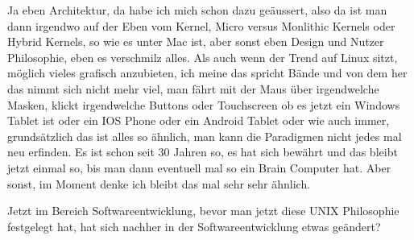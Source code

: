 \begin{description}
\NH Ja eben Architektur, da habe ich mich schon dazu geäussert, also da ist man dann irgendwo auf der Eben vom Kernel, Micro versus Monlithic Kernels oder Hybrid Kernels, so wie es unter Mac ist, aber sonst eben Design und Nutzer Philosophie, eben es verschmilz alles. Als auch wenn der Trend auf Linux sitzt, möglich vieles grafisch anzubieten, ich meine das spricht Bände und von dem her das nimmt sich nicht mehr viel, man fährt mit der Maus über irgendwelche Masken, klickt irgendwelche Buttons oder Touchscreen ob es jetzt ein Windows Tablet ist oder ein IOS Phone oder ein Android Tablet oder wie auch immer, grundsätzlich das ist alles so ähnlich, man kann die Paradigmen nicht jedes mal neu erfinden. Es ist schon seit 30 Jahren so, es hat sich bewährt und das bleibt jetzt einmal so, bis man dann eventuell mal so ein Brain Computer hat. Aber sonst, im Moment denke ich bleibt das mal sehr sehr ähnlich.

\DS Jetzt im Bereich Softwareentwicklung, bevor man jetzt diese UNIX Philosophie festgelegt hat, hat sich nachher in der Softwareentwicklung etwas geändert?


\end{description}
